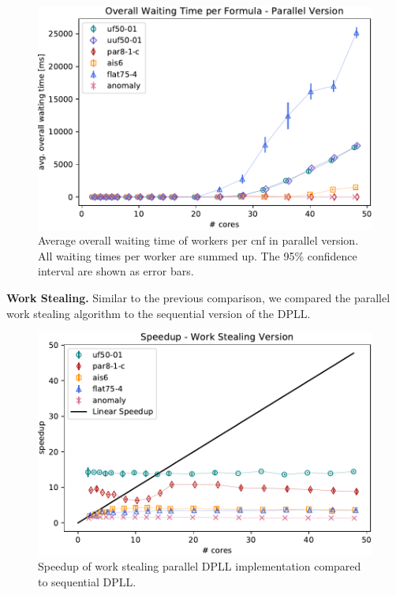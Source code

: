 \documentclass[letterpaper]{article}
\newcommand{\mypar}[1]{{\bf #1.}}
\begin{document}
\begin{figure}
    \centering
    \includegraphics[width=\columnwidth]{figures/waiting_parallel_subset_dpll_scaling_tar.pdf}
    \caption{Average overall waiting time of workers per cnf in parallel version.
    All waiting times per worker are summed up.
    The 95\% confidence interval are shown as error bars.}
    \label{fig:dpll_parallel_waiting}
\end{figure}

\mypar{Work Stealing}
Similar to the previous comparison, we compared the parallel work stealing algorithm to the sequential version of the DPLL.
\begin{figure}
  \centering
  \includegraphics[width=\columnwidth]{figures/scaling_stealing_subset_dpll_scaling_tar.pdf}
  \caption{Speedup of work stealing parallel DPLL implementation compared to sequential DPLL.
  \label{fig:dpll_stealing_speedup}}
\end{figure}
\end{document}
